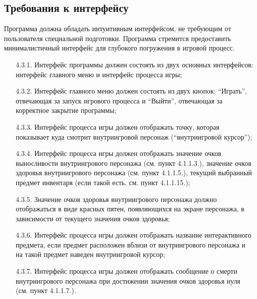 \subsection{Требования к интерфейсу}

Программа должна обладать интуитивным интерфейсом, не требующим от пользователя специальной подготовки. Программа стремится предоставить минималистичный интерфейс для глубокого погружения в игровой процесс.

\begin{enumerate}
    \item[4.3.1.] Интерфейс программы должен состоять из двух основных интерфейсов: интерфейс главного меню и интерфейс процесса игры;
    \item[4.3.2.] Интерфейс главного меню должен состоять из двух кнопок: ``Играть'', отвечающая за запуск игрового процесса и ``Выйти'', отвечающая за корректное закрытие программы;
    \item[4.3.3.] Интерфейс процесса игры должен отображать точку, которая показывает куда смотрит внутриигровой персонаж (``внутриигровой курсор'');
    \item[4.3.4.] Интерфейс процесса игры должен отображать значение очков выносливости внутриигрового персонажа (см. пункт 4.1.1.3.), значение очков здоровья внутриигрового персонажа (см. пункт 4.1.1.5.), текущий выбранный предмет инвентаря (если такой есть, см. пункт 4.1.1.15.);
    \item[4.3.5.] Значение очков здоровья внутриигрового персонажа должно отображаться в виде красных пятен, появляющихся на экране персонажа, в зависимости от текущего значения очков здоровья;
    \item[4.3.6.] Интерфейс процесса игры должен отображать название интерактивного предмета, если предмет расположен вблизи от внутриигрового персонажа и на такой предмет наведен внутриигровой курсор;
    \item[4.3.7.] Интерфейс процесса игры должен отображать сообщение о смерти внутриигрового персонажа при достижении значения очков здоровья нуля (см. пункт 4.1.1.7.). 
\end{enumerate}